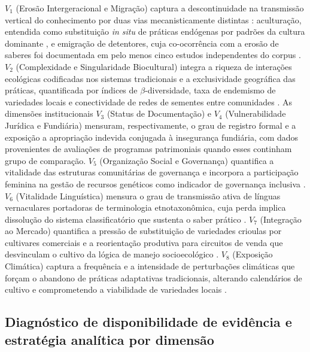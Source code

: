 \documentclass[12pt,a4paper]{article}
\begin{document}
$V_1$ (Erosão Intergeracional e Migração) captura a descontinuidade na transmissão vertical do conhecimento por duas vias mecanisticamente distintas \citep{ReyesGarcia2013}: aculturação, entendida como substituição \textit{in situ} de práticas endógenas por padrões da cultura dominante \citep{GomezBaggethun2013}, e emigração de detentores, cuja co-ocorrência com a erosão de saberes foi documentada em pelo menos cinco estudos independentes do corpus \citep{Tran2025,Moller2023,Bastos2022,VazquezDelfin2022,Aniah2019}. $V_2$ (Complexidade e Singularidade Biocultural) integra a riqueza de interações ecológicas codificadas nos sistemas tradicionais \citep{Jarvis2008,Brush2004} e a exclusividade geográfica das práticas, quantificada por índices de $\beta$-diversidade, taxa de endemismo de variedades locais e conectividade de redes de sementes entre comunidades \citep{Sibanda2025}. As dimensões institucionais $V_3$ (Status de Documentação) e $V_4$ (Vulnerabilidade Jurídica e Fundiária) mensuram, respectivamente, o grau de registro formal e a exposição a apropriação indevida conjugada à insegurança fundiária, com dados provenientes de avaliações de programas patrimoniais quando esses continham grupo de comparação. $V_5$ (Organização Social e Governança) quantifica a vitalidade das estruturas comunitárias de governança \citep{Ostrom1990,Pretty2003} e incorpora a participação feminina na gestão de recursos genéticos como indicador de governança inclusiva \citep{Sibanda2025,RomeroSilva2026,MugiNgenga2016}. $V_6$ (Vitalidade Linguística) mensura o grau de transmissão ativa de línguas vernaculares portadoras de terminologia etnotaxonômica, cuja perda implica dissolução do sistema classificatório que sustenta o saber prático \citep{CamaraLeret2021,LewisSiomns2010}. $V_7$ (Integração ao Mercado) quantifica a pressão de substituição de variedades crioulas por cultivares comerciais e a reorientação produtiva para circuitos de venda que desvinculam o cultivo da lógica de manejo socioecológico \citep{Godoy2005,ReyesGarcia2013}. $V_8$ (Exposição Climática) captura a frequência e a intensidade de perturbações climáticas que forçam o abandono de práticas adaptativas tradicionais, alterando calendários de cultivo e comprometendo a viabilidade de variedades locais \citep{Savo2016,Aniah2019}.

\subsection{Diagnóstico de disponibilidade de evidência e estratégia analítica por dimensão}
\label{sec:diagnosis}
\end{document}
